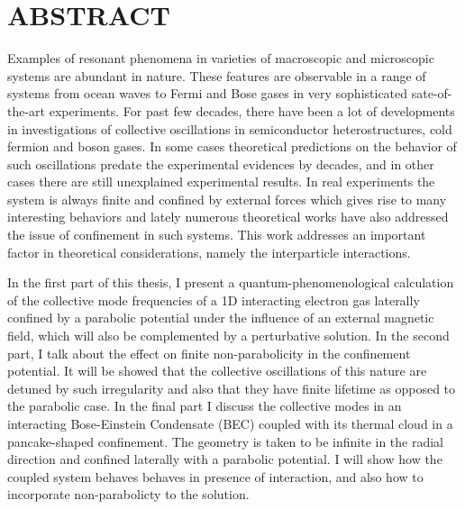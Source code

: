 \chapter*{ABSTRACT}
{
Examples of resonant phenomena in varieties of macroscopic and microscopic systems are abundant in nature. These features are observable in a range of systems from ocean waves to Fermi and Bose gases in very sophisticated sate-of-the-art experiments. For past few decades, there have been a lot of developments in investigations of collective oscillations in semiconductor heterostructures, cold fermion and boson gases. In some cases theoretical predictions on the behavior of such oscillations predate the experimental evidences by decades, and in other cases there are still unexplained experimental results. In real experiments the system is always finite and confined by external forces which gives rise to many interesting behaviors and lately numerous theoretical works have also addressed the issue of confinement in such systems. This work addresses an important factor in theoretical considerations, namely the interparticle interactions. 

In the first part of this thesis, I present a quantum-phenomenological calculation of the collective mode frequencies of a 1D interacting electron gas laterally confined by a parabolic potential under the influence of an external magnetic field, which will also be complemented by a perturbative solution. In the second part, I talk about the effect on finite non-parabolicity in the confinement potential. It will be showed that the collective oscillations of this nature are detuned by such irregularity and also that they have finite lifetime as opposed to the parabolic case. In the final part I discuss the collective modes in an interacting Bose-Einstein Condensate (BEC) coupled with its thermal cloud in a pancake-shaped confinement. The geometry is taken to be infinite in the radial direction and confined laterally with a parabolic potential. I will show how the coupled system behaves behaves in presence of interaction, and also how to incorporate non-parabolicty to the solution.


}


\newcommand{\abstracttext} %
{ 


}

\newpage
	\pagestyle{plain}
	\markboth{\thepage}{\thepage}
        \doublespace
\titleformat{\chapter}[display]   
{\normalfont\large\bfseries\centering}{\chaptertitlename\ \thechapter}{10pt}{\large}   
\titlespacing*{\chapter}{0pt}{-20pt}{25pt}
